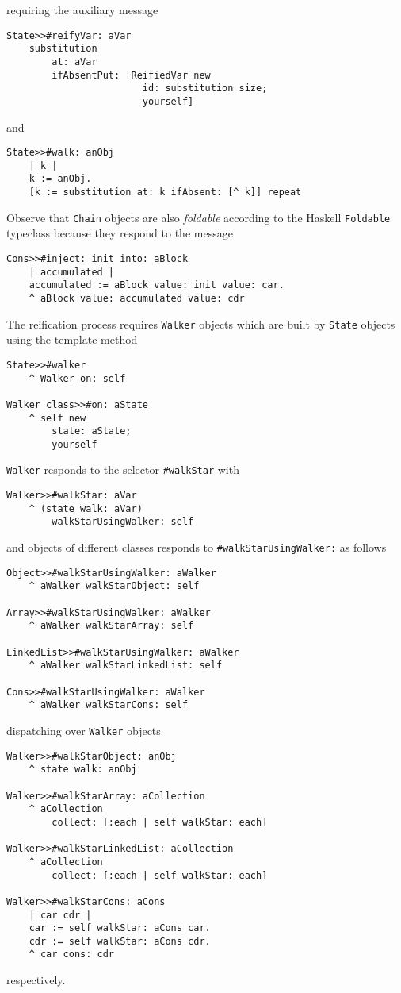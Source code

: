 \documentclass[a4paper,12pt]{article}
\begin{document}
requiring the auxiliary message
\begin{verbatim}
State>>#reifyVar: aVar 
    substitution
        at: aVar
        ifAbsentPut: [ReifiedVar new 
                        id: substitution size; 
                        yourself]
\end{verbatim}
and
\begin{verbatim}
State>>#walk: anObj 
    | k |
    k := anObj.
    [k := substitution at: k ifAbsent: [^ k]] repeat
\end{verbatim}
Observe that \Verb|Chain| objects are also \textit{foldable} according to the Haskell \Verb|Foldable| typeclass because 
they respond to the message
\begin{verbatim}
Cons>>#inject: init into: aBlock 
    | accumulated |
    accumulated := aBlock value: init value: car.
    ^ aBlock value: accumulated value: cdr
\end{verbatim}

The reification process requires \Verb|Walker| objects which are built by
\Verb|State| objects using the template method
\begin{verbatim}
State>>#walker
    ^ Walker on: self

Walker class>>#on: aState
    ^ self new
        state: aState;
        yourself
\end{verbatim}
\Verb|Walker| responds to the selector \Verb|#walkStar| with
\begin{verbatim}
Walker>>#walkStar: aVar
    ^ (state walk: aVar)
        walkStarUsingWalker: self
\end{verbatim}
and objects of different classes responds to \Verb|#walkStarUsingWalker:| as follows
\begin{verbatim}
Object>>#walkStarUsingWalker: aWalker
    ^ aWalker walkStarObject: self

Array>>#walkStarUsingWalker: aWalker
    ^ aWalker walkStarArray: self

LinkedList>>#walkStarUsingWalker: aWalker
    ^ aWalker walkStarLinkedList: self

Cons>>#walkStarUsingWalker: aWalker
    ^ aWalker walkStarCons: self
\end{verbatim}
dispatching over \Verb|Walker| objects
\begin{verbatim}
Walker>>#walkStarObject: anObj
    ^ state walk: anObj

Walker>>#walkStarArray: aCollection
    ^ aCollection
        collect: [:each | self walkStar: each]

Walker>>#walkStarLinkedList: aCollection
    ^ aCollection
        collect: [:each | self walkStar: each]

Walker>>#walkStarCons: aCons
    | car cdr |
    car := self walkStar: aCons car.
    cdr := self walkStar: aCons cdr.
    ^ car cons: cdr
\end{verbatim}
respectively.
\end{document}
